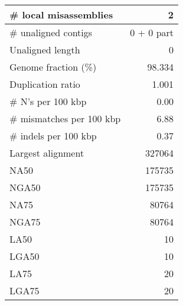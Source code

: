 \documentclass[12pt,a4paper]{article}
\begin{document}
\begin{table}[ht]
\begin{center}
\begin{tabular}{|l*{1}{|r}|}
\# local misassemblies & 2 \\ \hline
\# unaligned contigs & 0 + 0 part \\ \hline
Unaligned length & 0 \\ \hline
Genome fraction (\%) & 98.334 \\ \hline
Duplication ratio & 1.001 \\ \hline
\# N's per 100 kbp & 0.00 \\ \hline
\# mismatches per 100 kbp & 6.88 \\ \hline
\# indels per 100 kbp & 0.37 \\ \hline
Largest alignment & 327064 \\ \hline
NA50 & 175735 \\ \hline
NGA50 & 175735 \\ \hline
NA75 & 80764 \\ \hline
NGA75 & 80764 \\ \hline
LA50 & 10 \\ \hline
LGA50 & 10 \\ \hline
LA75 & 20 \\ \hline
LGA75 & 20 \\ \hline
\end{tabular}
\end{center}
\end{table}
\end{document}
